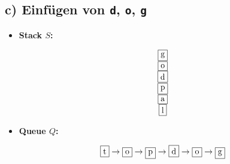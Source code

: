 \documentclass[a4paper,12pt]{article}
\begin{document}
\subsection*{c) Einfügen von \texttt{d}, \texttt{o}, \texttt{g}}

\begin{itemize}
  \item \textbf{Stack \( S \):}
  
  \[
  \begin{array}{c}
    \fbox{g} \\
    \fbox{o} \\
    \fbox{d} \\
    \fbox{p} \\
    \fbox{a} \\
    \fbox{l}
  \end{array}
  \]

  \item \textbf{Queue \( Q \):}
  
  \[
  \fbox{t} \rightarrow \fbox{o} \rightarrow \fbox{p} \rightarrow \fbox{d} \rightarrow \fbox{o} \rightarrow \fbox{g}
  \]
\end{itemize}
\end{document}

